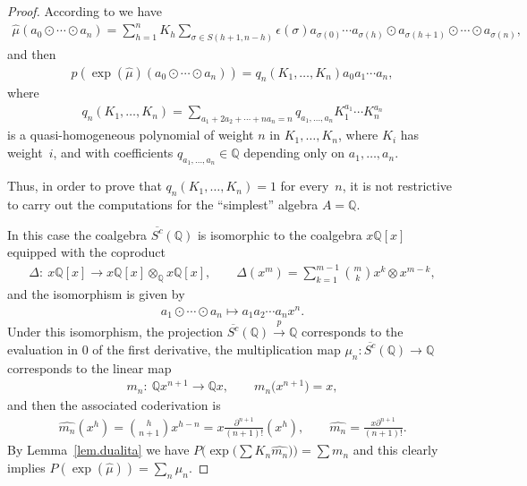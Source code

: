 \documentclass[pdftex]{sigma}
\newcommand{\Q}{\mathbb{Q}}
\numberwithin{equation}{section}
\begin{document}
\begin{proof}
According to \cite{LadaMarkl,LadaStas} we have
\begin{gather*}\widehat{\mu}(a_0\odot\cdots\odot a_n)=\sum_{h=1}^n
K_h\sum_{\sigma\in S(h+1,n-h)} \epsilon(\sigma) a_{\sigma(0)}\cdots a_{\sigma(h)}\odot a_{\sigma(h+1)}\odot\cdots\odot a_{\sigma(n)},\end{gather*}
and then
\begin{gather*} p(\exp(\widehat{\mu})(a_0\odot\cdots\odot a_n))=q_n(K_1,\ldots,K_{n})a_0a_1\cdots a_n,\end{gather*}
where
\begin{gather*} q_n(K_1,\ldots,K_n)=\sum_{a_1+2a_2+\cdots+na_n=n}q_{a_1,\ldots,a_n}K_1^{a_1}\cdots K_n^{a_n}\end{gather*}
is a quasi-homogeneous polynomial of weight $n$ in $K_1,\ldots,K_n$, where $K_i$ has weight~$i$, and with coef\/f\/icients $q_{a_1,\ldots,a_n}\in \Q$ depending only on $a_1,\ldots,a_n$.

Thus, in order to prove that $q_n(K_1,\ldots,K_{n})=1$ for every~$n$, it is not restrictive to carry out the computations for the ``simplest'' algebra $A=\Q$.

In this case the coalgebra $\overline{S^c}(\Q)$ is isomorphic to the coalgebra $x\Q[x]$ equipped with the coproduct
\begin{gather*} \Delta\colon \ x\Q[x]\to x\Q[x]\otimes_{\Q} x\Q[x],\qquad \Delta(x^m)=\sum_{k=1}^{m-1}
\binom{m}{k}x^k\otimes x^{m-k},\end{gather*}
and the isomorphism is given by
\begin{gather*} a_1\odot\cdots \odot a_n\mapsto a_1a_2\cdots a_nx^n.\end{gather*}
Under this isomorphism, the projection $\overline{S^c}(\Q)\xrightarrow{ p }\Q$ corresponds to the evaluation in $0$ of the f\/irst derivative, the multiplication map $\mu_n\colon \overline{S^c}(\Q)\xrightarrow{\,}\Q$ corresponds to the linear map
\begin{gather*}m_n\colon \ \Q x^{n+1}\to \Q x,\qquad m_n\big(x^{n+1}\big)=x,\end{gather*}
and then the associated coderivation is
\begin{gather*} \widehat{m_n}(x^h)=\binom{h}{n+1}x^{h-n}=x\frac{\partial^{n+1}}{(n+1)!}(x^h),\qquad
\widehat{m_n}=\frac{x\partial^{n+1}}{(n+1)!} .
\end{gather*}
By Lemma~\ref{lem.dualita} we have $P\big(\exp\big(\sum K_n\widehat{m_n}\big)\big)=\sum m_n$ and this clearly implies $P(\exp(\widehat{\mu}))=\sum_n\mu_n$.


\end{proof}
\end{document}
